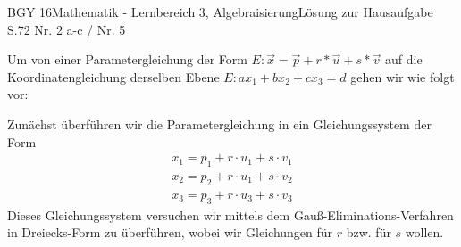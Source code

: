 \documentclass[oneside,openany,headings=optiontotoc,11pt,numbers=noenddot]{scrreprt}
\begin{document}
	\begin{worksheet}{BGY 16}{Mathematik - Lernbereich 3, Algebraisierung}{Lösung zur Hausaufgabe S.72 Nr. 2 a-c / Nr. 5}
		
		\begin{framed}
			Um von einer Parametergleichung der Form \(E: \vec{x} = \vec{p} + r*\vec{u} + s*\vec{v}\) auf die Koordinatengleichung derselben Ebene \(E: ax_1 + bx_2 + cx_3 = d\) gehen wir wie folgt vor:\\
			\par\noindent
			Zunächst überführen wir die Parametergleichung in ein Gleichungssystem der Form
			\begin{align*}
				x_1 = p_1 + r\cdot{}u_1 + s\cdot{}v_1\\
				x_2 = p_2 + r\cdot{}u_1 + s\cdot{}v_2\\
				x_3 = p_3 + r\cdot{}u_3 + s\cdot{}v_3
			\end{align*}
			Dieses Gleichungssystem versuchen wir mittels dem Gauß-Eliminations-Verfahren in Dreiecks-Form zu überführen, wobei wir Gleichungen für \(r\)  bzw. für \(s\) wollen.
			\begin{tabular}{ll}
				

\end{tabular}
\end{framed}
\end{worksheet}
\end{document}
